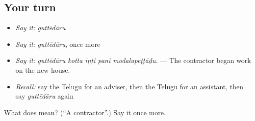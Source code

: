 \subsection*{Your turn}
\begin{itemize}
\raggedright
  \item \emph{Say it:} \emph{guttēdāru}
  \item \emph{Say it:} \emph{guttēdāru}, once more
  \item \emph{Say it:} \emph{guttēdāru kotta iṇṭi pani modalupeṭṭāḍu.} — The contractor began work on the new house.
  \item \emph{Recall:} say the Telugu for an adviser, then the Telugu for an assistant, then say \emph{guttēdāru} again
\end{itemize}

\begin{tcolorbox}[breakable,colback=teal!4,colframe=teal!35!black,title={Before you move on}]
What does  mean? (\textquotedblleft{}A contractor\textquotedblright{}.) Say it once more.
\end{tcolorbox}
